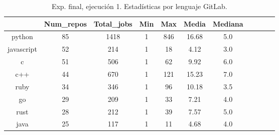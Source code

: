 \begin{table}[h]
  \centering
  \caption{Exp. final, ejecución 1. Estadísticas por lenguaje GitLab.}
  \label{tab:tabla_f1_8}

\begin{footnotesize}
\renewcommand{\arraystretch}{1.5} %
\begin{tabular}{ccccccccccc}
  \hline
  {} &  Num\_repos &  Total\_jobs &  Min &  Max &  Media &  Mediana \\
  \hline
  python           &         85 &        1418 &    1 &  846 &  16.68 &      5.0 \\
  javascript       &         52 &         214 &    1 &   18 &   4.12 &      3.0 \\
  c                &         51 &         506 &    1 &   62 &   9.92 &      6.0 \\
  c++              &         44 &         670 &    1 &  121 &  15.23 &      7.0 \\
  ruby             &         34 &         346 &    1 &   96 &  10.18 &      3.5 \\
  go               &         29 &         209 &    1 &   33 &   7.21 &      4.0 \\
  rust             &         28 &         212 &    1 &   39 &   7.57 &      5.0 \\
  java             &         25 &         117 &    1 &   11 &   4.68 &      4.0 \\

\end{tabular}
\end{footnotesize}
\end{table}
